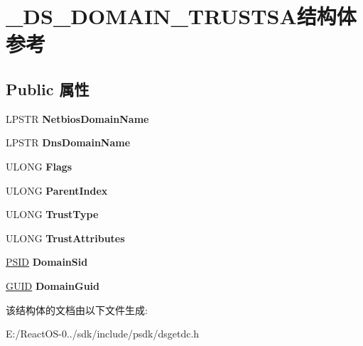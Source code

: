\hypertarget{struct___d_s___d_o_m_a_i_n___t_r_u_s_t_s_a}{}\section{\+\_\+\+D\+S\+\_\+\+D\+O\+M\+A\+I\+N\+\_\+\+T\+R\+U\+S\+T\+S\+A结构体 参考}
\label{struct___d_s___d_o_m_a_i_n___t_r_u_s_t_s_a}
\subsection*{Public 属性}
\begin{DoxyCompactItemize}
\item 
\mbox{\label{struct___d_s___d_o_m_a_i_n___t_r_u_s_t_s_a_a824380952dd6625a198cd385a7cc555d}} 
L\+P\+S\+TR {\bfseries Netbios\+Domain\+Name}
\item 
\mbox{\label{struct___d_s___d_o_m_a_i_n___t_r_u_s_t_s_a_ab6780e023a1571f3379e733c73935e36}} 
L\+P\+S\+TR {\bfseries Dns\+Domain\+Name}
\item 
\mbox{\label{struct___d_s___d_o_m_a_i_n___t_r_u_s_t_s_a_a58fc862453a9bc176268ff5adac28e01}} 
U\+L\+O\+NG {\bfseries Flags}
\item 
\mbox{\label{struct___d_s___d_o_m_a_i_n___t_r_u_s_t_s_a_a0dc78d7ae1209b8e3346469991407275}} 
U\+L\+O\+NG {\bfseries Parent\+Index}
\item 
\mbox{\label{struct___d_s___d_o_m_a_i_n___t_r_u_s_t_s_a_aa6152473d77e7250b8423b863d90f960}} 
U\+L\+O\+NG {\bfseries Trust\+Type}
\item 
\mbox{\label{struct___d_s___d_o_m_a_i_n___t_r_u_s_t_s_a_a9425727a33a109e6449ba8b0bc2381d3}} 
U\+L\+O\+NG {\bfseries Trust\+Attributes}
\item 
\mbox{\label{struct___d_s___d_o_m_a_i_n___t_r_u_s_t_s_a_aef7a7ca1639acd211d1f8622a315916b}} 
\hyperlink{struct___s_i_d}{P\+S\+ID} {\bfseries Domain\+Sid}
\item 
\mbox{\label{struct___d_s___d_o_m_a_i_n___t_r_u_s_t_s_a_abf8eaf5ad98645ec29f30dc623f3c545}} 
\hyperlink{interface_g_u_i_d}{G\+U\+ID} {\bfseries Domain\+Guid}
\end{DoxyCompactItemize}


该结构体的文档由以下文件生成\+:\begin{DoxyCompactItemize}
\item 
E\+:/\+React\+O\+S-\/0../sdk/include/psdk/dsgetdc.\+h\end{DoxyCompactItemize}
